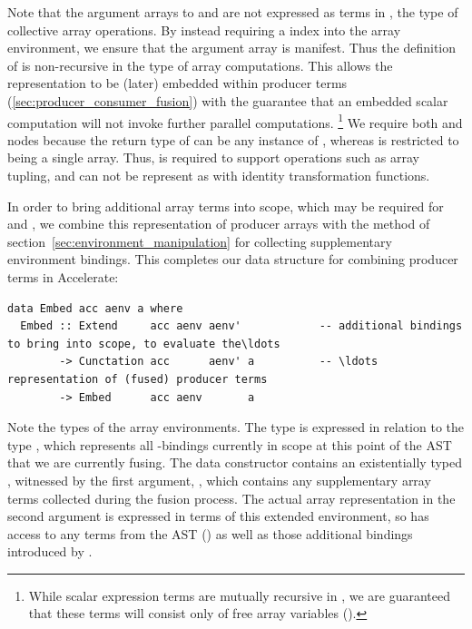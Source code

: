 Note that the argument arrays to  and  are not expressed
as terms in , the type of collective array operations. By instead
requiring a  index  into the array environment, we
ensure that the argument array is manifest. Thus the definition of
 is non-recursive in the type of array computations. This
allows the representation to be (later) embedded within producer terms
(\ref{sec:producer_consumer_fusion}) with the guarantee that an embedded scalar
computation will not invoke further parallel computations.%
\footnote{While scalar expression terms are mutually recursive in , we
are guaranteed that these terms will consist only of free array variables
().} We require both  and  nodes because the
return type of  can be any instance of , whereas
 is restricted to being a single array. Thus,  is required
to support operations such as array tupling, and can not be represent as
 with identity transformation functions.

In order to bring additional array terms into scope, which may be required for
 and , we combine this representation of producer
arrays with the method of section~\ref{sec:environment_manipulation} for
collecting supplementary environment bindings. This completes our data structure
for combining producer terms in Accelerate:
%
\begin{lstlisting}[style=haskell,
    caption={Representation of fused producer arrays in Accelerate}]
data Embed acc aenv a where
  Embed :: Extend     acc aenv aenv'            -- additional bindings to bring into scope, to evaluate the\ldots
        -> Cunctation acc      aenv' a          -- \ldots representation of (fused) producer terms
        -> Embed      acc aenv       a
\end{lstlisting}

Note the types of the array environments. The  type is expressed in
relation to the type , which represents all -bindings
currently in scope at this point of the AST that we
are currently fusing. The data constructor contains an existentially typed
, witnessed by the first argument, , which contains any
supplementary array terms collected during the fusion process. The actual array
representation in the second argument is expressed in terms of this extended
environment, so has access to any terms from the AST () as well as
those additional bindings introduced by .

